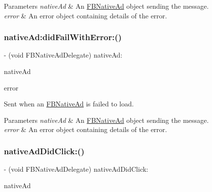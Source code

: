 \begin{DoxyParams}{Parameters}
{\em native\+Ad} & An \hyperlink{interfaceFBNativeAd}{F\+B\+Native\+Ad} object sending the message. \\
\hline
{\em error} & An error object containing details of the error. \\
\hline
\end{DoxyParams}
\mbox{\label{protocolFBNativeAdDelegate_01-p_a310f7227d74f4223c64e2543ab346304}} 
\subsubsection{\texorpdfstring{native\+Ad\+:did\+Fail\+With\+Error\+:()}{nativeAd:didFailWithError:()}\hspace{0.1cm}{\footnotesize\ttfamily [5/5]}}
{\footnotesize\ttfamily -\/ (void F\+B\+Native\+Ad\+Delegate) native\+Ad\+: \begin{DoxyParamCaption}\item[{(\hyperlink{interfaceFBNativeAd}{F\+B\+Native\+Ad} $\ast$)}]{native\+Ad }\item[{didFailWithError:(N\+S\+Error $\ast$)}]{error }\end{DoxyParamCaption}}

Sent when an \hyperlink{interfaceFBNativeAd}{F\+B\+Native\+Ad} is failed to load.


\begin{DoxyParams}{Parameters}
{\em native\+Ad} & An \hyperlink{interfaceFBNativeAd}{F\+B\+Native\+Ad} object sending the message. \\
\hline
{\em error} & An error object containing details of the error. \\
\hline
\end{DoxyParams}
\mbox{\label{protocolFBNativeAdDelegate_01-p_a6f95570584b282e947d029d855242d11}} 
\subsubsection{\texorpdfstring{native\+Ad\+Did\+Click\+:()}{nativeAdDidClick:()}\hspace{0.1cm}{\footnotesize\ttfamily [1/5]}}
{\footnotesize\ttfamily -\/ (void F\+B\+Native\+Ad\+Delegate) native\+Ad\+Did\+Click\+: \begin{DoxyParamCaption}\item[{(\hyperlink{interfaceFBNativeAd}{F\+B\+Native\+Ad} $\ast$)}]{native\+Ad }\end{DoxyParamCaption}}

